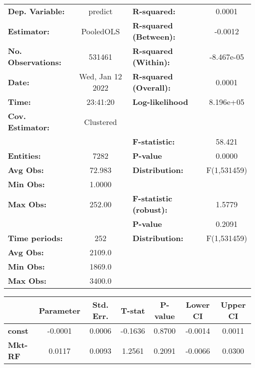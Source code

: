 \begin{center}
\begin{tabular}{lclc}
\toprule
\textbf{Dep. Variable:}    &      predict       & \textbf{  R-squared:         }   &      0.0001      \\
\textbf{Estimator:}        &     PooledOLS      & \textbf{  R-squared (Between):}  &     -0.0012      \\
\textbf{No. Observations:} &       531461       & \textbf{  R-squared (Within):}   &    -8.467e-05    \\
\textbf{Date:}             &  Wed, Jan 12 2022  & \textbf{  R-squared (Overall):}  &      0.0001      \\
\textbf{Time:}             &      23:41:20      & \textbf{  Log-likelihood     }   &    8.196e+05     \\
\textbf{Cov. Estimator:}   &     Clustered      & \textbf{                     }   &                  \\
\textbf{}                  &                    & \textbf{  F-statistic:       }   &      58.421      \\
\textbf{Entities:}         &        7282        & \textbf{  P-value            }   &      0.0000      \\
\textbf{Avg Obs:}          &       72.983       & \textbf{  Distribution:      }   &   F(1,531459)    \\
\textbf{Min Obs:}          &       1.0000       & \textbf{                     }   &                  \\
\textbf{Max Obs:}          &       252.00       & \textbf{  F-statistic (robust):} &      1.5779      \\
\textbf{}                  &                    & \textbf{  P-value            }   &      0.2091      \\
\textbf{Time periods:}     &        252         & \textbf{  Distribution:      }   &   F(1,531459)    \\
\textbf{Avg Obs:}          &       2109.0       & \textbf{                     }   &                  \\
\textbf{Min Obs:}          &       1869.0       & \textbf{                     }   &                  \\
\textbf{Max Obs:}          &       3400.0       & \textbf{                     }   &                  \\
\bottomrule
\end{tabular}
\begin{tabular}{lcccccc}
                & \textbf{Parameter} & \textbf{Std. Err.} & \textbf{T-stat} & \textbf{P-value} & \textbf{Lower CI} & \textbf{Upper CI}  \\
\midrule
\textbf{const}  &      -0.0001       &       0.0006       &     -0.1636     &      0.8700      &      -0.0014      &       0.0011       \\
\textbf{Mkt-RF} &       0.0117       &       0.0093       &      1.2561     &      0.2091      &      -0.0066      &       0.0300       \\
\bottomrule
\end{tabular}
\end{center}
